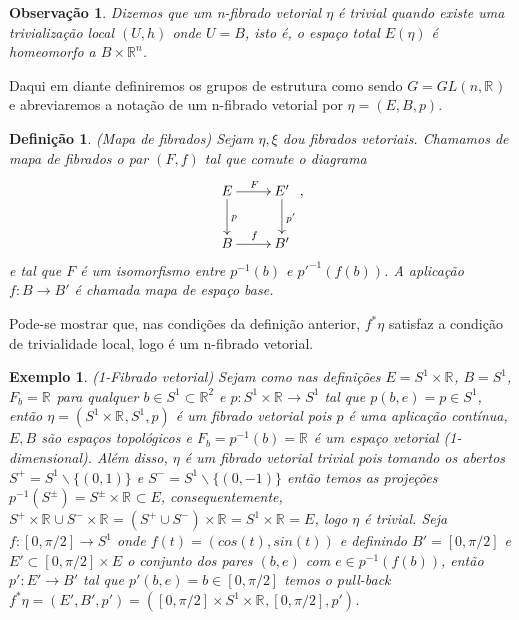 \documentclass[12pt]{book}
\newtheorem{definicao}[teorema]{Definição}
\newtheorem{exemplo}[teorema]{Exemplo}
\newtheorem{observacao}[teorema]{Observação}
\newcommand{\real}[1]{\mathbb{R}^{#1}}
\newcommand{\vermelho}[1]{{\color{red}#1}}
\begin{document}
	\begin{observacao}\label{observacao_fibrado_vetorial_trivial}
		Dizemos que um n-fibrado vetorial $\eta$ é trivial quando existe uma trivialização local $(U, h)$ onde $U = B$, isto é, o espaço total $E(\eta)$ é homeomorfo a $B\times \real{n}$.
	\end{observacao}
	
	Daqui em diante definiremos os grupos de estrutura como sendo $G = GL(n,\real{})$ e abreviaremos a notação de um n-fibrado vetorial por $\eta = (E,B,p)$.
	
	\begin{definicao}
		(Mapa de fibrados) Sejam $\eta, \xi$ dou fibrados vetoriais. Chamamos de mapa de fibrados o par $(F, f)$ tal que comute o diagrama
		$$
		\xymatrix{
			E \ar[r]^{F}\ar[d]^{p} & E'\ar[d]^{p'}
			\\
			B\ar[r]^{f} & B'
		},
		$$
		e tal que $F$ é um isomorfismo entre $p^{-1}(b)$ e $p'^{-1}(f(b))$. A aplicação $f:B\to B'$ é chamada mapa de espaço base.
	\end{definicao}
	
	Pode-se mostrar que, nas condições da definição anterior, $f^{*}\eta$ satisfaz a condição de trivialidade local, logo é um n-fibrado vetorial.
	
	\begin{exemplo}
		(1-Fibrado vetorial) Sejam como nas definições $E=S^{1} \times \real{}$, $B=S^{1}$, $F_{b} = \real{}$ para qualquer $b \in S^{1}\subset \real{2}$ e $p:S^{1} \times \real{}\to S^{1}$ tal que $p(b, e)=p \in S^{1}$, então $\eta=(S^{1} \times \real{}, S^{1}, p)$ é um fibrado vetorial pois $p$ é uma aplicação contínua, $E, B$ são espaços topológicos e $F_{b} = p^{-1}(b) = \real{}$ é um espaço vetorial (1-dimensional). Além disso, $\eta$ é um fibrado vetorial trivial pois tomando os abertos $S^{+} = S^{1} \backslash \{(0,1)\}$ e $S^{-} = S^{1} \backslash \{(0,-1)\}$ então temos as projeções $p^{-1}(S^{\pm}) = S^{\pm} \times \real{} \subset E$, consequentemente, $S^{+}\times\real{} \cup S^{-}\times\real{} = (S^{+}\cup S^{-})\times\real{} = S^{1} \times\real{} =E$, logo $\eta$ é trivial. Seja $f:[0,\pi/2] \to S^{1}$ onde $f(t) = (cos(t), sin(t))$ e definindo $B' =[0,\pi/2]$ e $E' \subset [0,\pi/2]\times E$ o conjunto dos pares $(b, e)$ com $e \in p^{-1}(f(b))$, então $p': E'\to B'$ tal que $p'(b, e) = b \in [0,\pi/2]$ \vermelho{temos o pull-back $f^{*}\eta = (E', B', p') = ([0,\pi/2]\times S^{1}\times \real{}, [0,\pi/2], p')$.}
	\end{exemplo}
	
\end{document}
